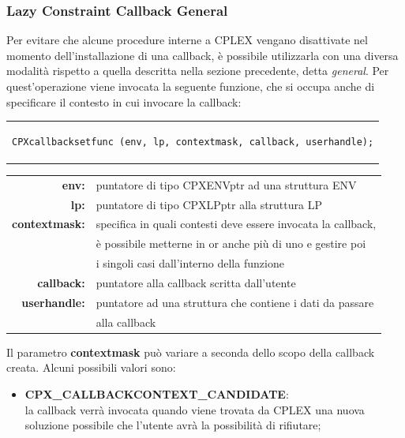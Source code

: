 \begin{center}
\begin{center}
\subsubsection{Lazy Constraint Callback General}%
Per evitare che alcune procedure interne a CPLEX vengano disattivate nel momento dell'installazione di una callback, è possibile utilizzarla con una diversa modalità rispetto a quella descritta nella sezione precedente, detta \textit{general}. Per quest'operazione viene invocata la seguente funzione, che si occupa anche di specificare il contesto in cui invocare la callback:
\begin{center}
\begin{tabular}{c}
\begin{lstlisting}[linewidth=382pt, basicstyle=\footnotesize\sffamily,]    
CPXcallbacksetfunc (env, lp, contextmask, callback, userhandle);
\end{lstlisting}
\end{tabular}
\end{center}
\begin{table}[h]
\centering
\begin{tabular}{rl}
\textbf{env:} & {puntatore di tipo CPXENVptr ad una struttura ENV}\\
\textbf{lp:} & {puntatore di tipo CPXLPptr alla struttura LP}\\
\textbf{contextmask:} & {specifica in quali contesti deve essere invocata la callback,}\\
&{è possibile metterne in or anche più di uno e gestire poi}\\
&{i singoli casi dall'interno della funzione}\\
\textbf{callback:} & {puntatore alla callback scritta dall'utente} \\
\textbf{userhandle:} & {puntatore ad una struttura che contiene i dati da passare} \\
&{alla callback}\\
\end{tabular}
\end{table}
Il parametro \textbf{contextmask} può variare a seconda dello scopo della callback creata. Alcuni possibili valori sono:
\begin{itemize}
\item{\textbf{CPX\_CALLBACKCONTEXT\_CANDIDATE}:\\la callback verrà invocata quando viene trovata da CPLEX una nuova soluzione possibile che l'utente avrà la possibilità di rifiutare;}

\end{itemize}
\end{center}
\end{center}
